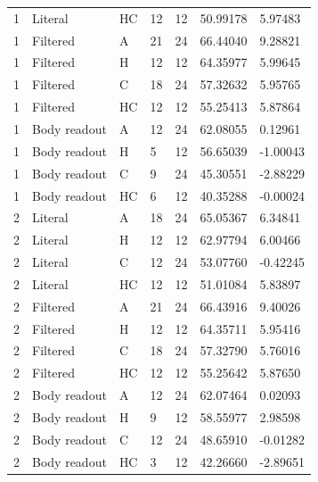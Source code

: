 \begin{longtable}{lllllll}
1 & Literal & HC & 12 & 12 & 50.99178 & 5.97483 \\
1 & Filtered & A & 21 & 24 & 66.44040 & 9.28821 \\
1 & Filtered & H & 12 & 12 & 64.35977 & 5.99645 \\
1 & Filtered & C & 18 & 24 & 57.32632 & 5.95765 \\
1 & Filtered & HC & 12 & 12 & 55.25413 & 5.87864 \\
1 & Body readout & A & 12 & 24 & 62.08055 & 0.12961 \\
1 & Body readout & H & 5 & 12 & 56.65039 & -1.00043 \\
1 & Body readout & C & 9 & 24 & 45.30551 & -2.88229 \\
1 & Body readout & HC & 6 & 12 & 40.35288 & -0.00024 \\
2 & Literal & A & 18 & 24 & 65.05367 & 6.34841 \\
2 & Literal & H & 12 & 12 & 62.97794 & 6.00466 \\
2 & Literal & C & 12 & 24 & 53.07760 & -0.42245 \\
2 & Literal & HC & 12 & 12 & 51.01084 & 5.83897 \\
2 & Filtered & A & 21 & 24 & 66.43916 & 9.40026 \\
2 & Filtered & H & 12 & 12 & 64.35711 & 5.95416 \\
2 & Filtered & C & 18 & 24 & 57.32790 & 5.76016 \\
2 & Filtered & HC & 12 & 12 & 55.25642 & 5.87650 \\
2 & Body readout & A & 12 & 24 & 62.07464 & 0.02093 \\
2 & Body readout & H & 9 & 12 & 58.55977 & 2.98598 \\
2 & Body readout & C & 12 & 24 & 48.65910 & -0.01282 \\
2 & Body readout & HC & 3 & 12 & 42.26660 & -2.89651 \\
\bottomrule
\end{longtable}
